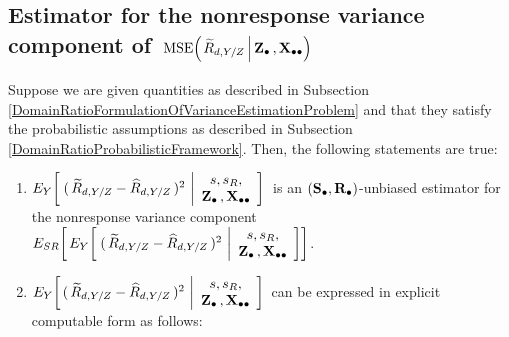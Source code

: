 \subsection{Estimator for the nonresponse variance component of
\,$\textnormal{MSE}\!\left(\left.\widetilde{R}_{d,Y/Z}\,\right\vert\mathbf{Z}_{\bullet}\,,\mathbf{X}_{\bullet\bullet}\right)$}
\setcounter{theorem}{0}


\vskip 0.1cm
\begin{lemma}
\label{DomainRatioNonresponseVariance}
\mbox{}
\vskip 0.1cm
\noindent
Suppose we are given quantities as described in Subsection
\ref{DomainRatioFormulationOfVarianceEstimationProblem}
and
that they satisfy the probabilistic assumptions as described in Subsection
\ref{DomainRatioProbabilisticFramework}.
\vskip 0.1cm
\noindent
Then, the following statements are true:
\renewcommand{\theenumi}{\roman{enumi}}
\renewcommand{\labelenumi}{\mbox{}\;\;\,(\theenumi)$\quad$}
\begin{enumerate}
\item
    $
    E_{Y}\!\left[\;
        (\,\widetilde{R}_{d,Y/Z} - \widehat{R}_{d,Y/Z}\,)^{2}
        \,\left\vert
        \begin{array}{c}
            s,s_{R},
            \\
            \mathbf{Z}_{\bullet}\,,\mathbf{X}_{\bullet\bullet}
            \end{array}
        \right.
        \!\right]
    $\,
    is an $(\mathbf{S}_{\bullet},\mathbf{R}_{\bullet})$-unbiased estimator for the nonresponse variance component
    \,$
    E_{SR}\!\left[\,
    E_{Y}\!\left[\;
        (\,\widetilde{R}_{d,Y/Z} - \widehat{R}_{d,Y/Z}\,)^{2}
        \,\left\vert
        \begin{array}{c}
            s,s_{R},
            \\
            \mathbf{Z}_{\bullet}\,,\mathbf{X}_{\bullet\bullet}
            \end{array}
        \right.
        \!\right]
        \right]
    $.
\item
    $
    E_{Y}\!\left[\,
        (\,\widetilde{R}_{d,Y/Z} - \widehat{R}_{d,Y/Z}\,)^{2}
        \,\left\vert
        \begin{array}{c}
            s,s_{R},
            \\
            \mathbf{Z}_{\bullet}\,,\mathbf{X}_{\bullet\bullet}
            \end{array}
        \right.
        \!\right]
    $\,
    can be expressed in explicit computable form as follows:
    \begin{eqnarray*}
    &&

\end{eqnarray*}
\end{enumerate}
\end{lemma}

